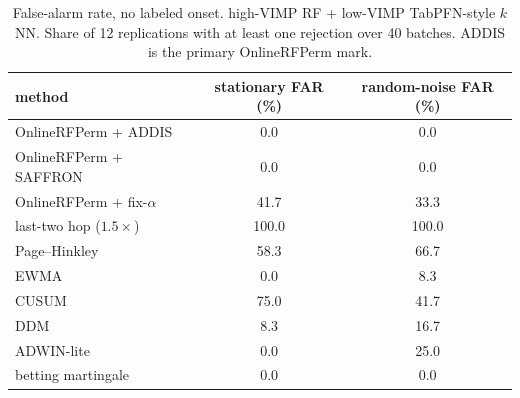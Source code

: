 \begin{table}[ht]
\centering
\caption{False-alarm rate, no labeled onset. high-VIMP RF + low-VIMP TabPFN-style $k$NN. Share of 12 replications with at least one rejection over 40 batches. ADDIS is the primary OnlineRFPerm mark.}
\label{tab:far}
\begin{tabular}{lcc}
\toprule
method & stationary FAR (\%) & random-noise FAR (\%) \\
\midrule
OnlineRFPerm + ADDIS & 0.0 & 0.0 \\
OnlineRFPerm + SAFFRON & 0.0 & 0.0 \\
OnlineRFPerm + fix-$\alpha$ & 41.7 & 33.3 \\
last-two hop ($1.5\times$) & 100.0 & 100.0 \\
Page--Hinkley & 58.3 & 66.7 \\
EWMA & 0.0 & 8.3 \\
CUSUM & 75.0 & 41.7 \\
DDM & 8.3 & 16.7 \\
ADWIN-lite & 0.0 & 25.0 \\
betting martingale & 0.0 & 0.0 \\
\bottomrule
\end{tabular}
\end{table}
